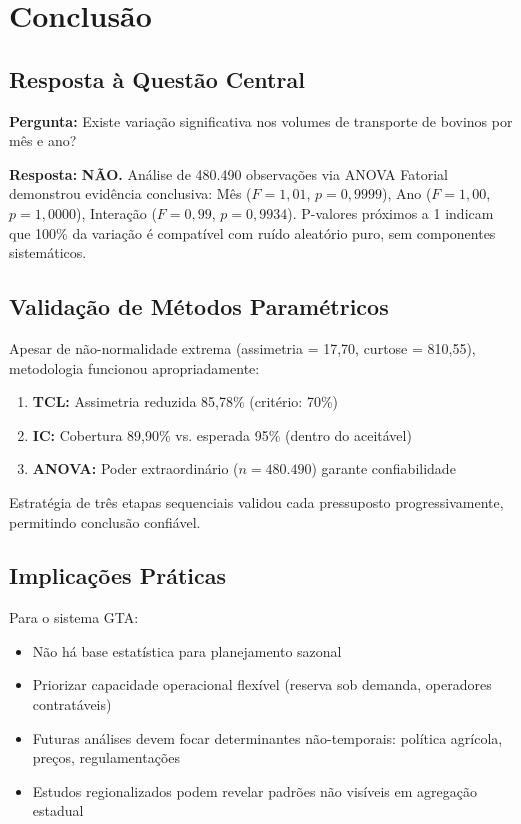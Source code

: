 \documentclass[12pt,a4paper]{article}
\begin{document}
\section{Conclusão}

\subsection*{Resposta à Questão Central}

\textbf{Pergunta:} Existe variação significativa nos volumes de transporte de bovinos por mês e ano?

\textbf{Resposta:} \textbf{NÃO.} Análise de 480.490 observações via ANOVA Fatorial demonstrou evidência conclusiva: Mês ($F = 1,01$, $p = 0,9999$), Ano ($F = 1,00$, $p = 1,0000$), Interação ($F = 0,99$, $p = 0,9934$). P-valores próximos a 1 indicam que 100\% da variação é compatível com ruído aleatório puro, sem componentes sistemáticos.

\subsection*{Validação de Métodos Paramétricos}

Apesar de não-normalidade extrema (assimetria = 17,70, curtose = 810,55), metodologia funcionou apropriadamente:

\begin{enumerate}
    \item \textbf{TCL:} Assimetria reduzida 85,78\% (critério: 70\%)
    \item \textbf{IC:} Cobertura 89,90\% vs. esperada 95\% (dentro do aceitável)
    \item \textbf{ANOVA:} Poder extraordinário ($n = 480.490$) garante confiabilidade
\end{enumerate}

Estratégia de três etapas sequenciais validou cada pressuposto progressivamente, permitindo conclusão confiável.

\subsection*{Implicações Práticas}

Para o sistema GTA:
\begin{itemize}
    \item Não há base estatística para planejamento sazonal
    \item Priorizar capacidade operacional flexível (reserva sob demanda, operadores contratáveis)
    \item Futuras análises devem focar determinantes não-temporais: política agrícola, preços, regulamentações
    \item Estudos regionalizados podem revelar padrões não visíveis em agregação estadual
\end{itemize}
\end{document}
